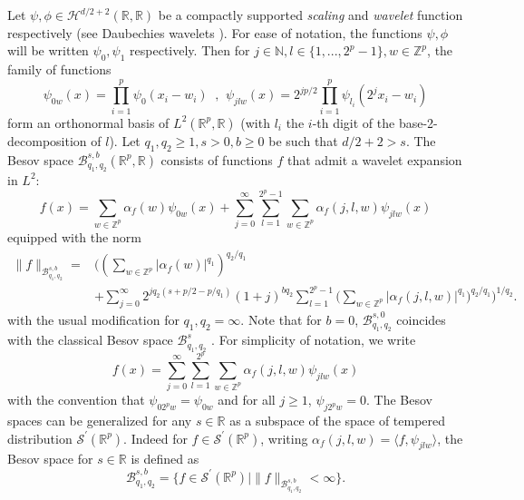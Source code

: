\documentclass[10pt]{article}
\begin{document}
Let $\psi,\phi\in \mathcal{H}^{d/2+2}(\mathbb{R},\mathbb{R})$ be a compactly supported \emph{scaling} and \emph{wavelet} function respectively (see Daubechies wavelets \citep{daubechies1988orthonormal}). For ease of notation, the functions $\psi,\phi$ will be written $\psi_0,\psi_1$ respectively. Then for $j\in \mathbb{N},l \in \{1,...,2^p-1\}, w \in \mathbb{Z}^p$, the family of functions 
$$\psi_{0w}(x) = \prod \limits_{i=1}^p \psi_{0}(x_i-w_i) \ \text{ , } \ \psi_{jlw}(x) = 2^{jp/2}\prod \limits_{i=1}^p \psi_{l_i}(2^{j}x_i-w_i)
$$
form an orthonormal basis of $L^2(\mathbb{R}^p,\mathbb{R})$ (with $l_i$ the $i$-th digit of the base-2-decomposition of $l$).
Let $q_1,q_2\geq 1,s>0,b\geq 0$ be such that $d/2+2>s$. The Besov space $\mathcal{B}^{s,b}_{q_1,q_2}(\mathbb{R}^p,\mathbb{R})$ consists of functions $f$ that admit a wavelet expansion in $L^2$:
$$
f(x)=\sum \limits_{w\in \mathbb{Z}^p} \alpha_f(w)\psi_{0w}(x) + \sum \limits_{j=0}^\infty \sum \limits_{l=1}^{2^p-1}\sum \limits_{w\in \mathbb{Z}^p} \alpha_f(j,l,w)\psi_{jlw}(x)
$$
equipped with the norm
\begin{align*}
\|f\|_{\mathcal{B}^{s,b}_{q_1,q_2}}= &\Biggl(\left(\sum \limits_{w\in \mathbb{Z}^p} |\alpha_f(w)|^{q_1}\right)^{q_2/q_1}\\
& +\sum \limits_{j=0}^\infty 2^{jq_2(s+p/2-p/q_1)}(1+j)^{bq_2} \sum \limits_{l=1}^{2^p-1} \Big(\sum \limits_{w\in \mathbb{Z}^p} |\alpha_f(j,l,w)|^{q_1}\Big)^{q_2/q_1}\Biggl)^{1/q_2}.
\end{align*}
with the usual modification for $q_1,q_2=\infty$.
Note that for $b=0$, $\mathcal{B}^{s,0}_{q_1,q_2}$ coincides with the classical Besov space $\mathcal{B}^{s}_{q_1,q_2}$ \citep{gine_nickl_2015}.
For simplicity of notation, we write
$$
f(x)= \sum \limits_{j=0}^\infty \sum \limits_{l=1}^{2^p}\sum \limits_{w\in \mathbb{Z}^p} \alpha_f(j,l,w)\psi_{jlw}(x)
$$
with the convention that $\psi_{02^pw}=\psi_{0w}$ and for all $j\geq 1$, $\psi_{j2^pw}=0$. The Besov spaces can be generalized for any $s\in \mathbb{R}$ as a subspace of the space of tempered distribution $\mathcal{S}^{'}(\mathbb{R}^p)$. Indeed for $f \in \mathcal{S}^{'}(\mathbb{R}^p)$, writing $\alpha_f(j,l,w)=\langle f,\psi_{jlw}\rangle$, the Besov space for $s\in \mathbb{R}$ is defined as
$$\mathcal{B}^{s,b}_{q_1,q_2}=\{f\in \mathcal{S}^{'}(\mathbb{R}^p) | \|f\|_{\mathcal{B}^{s,b}_{q_1,q_2}}<\infty\}.$$
\end{document}
